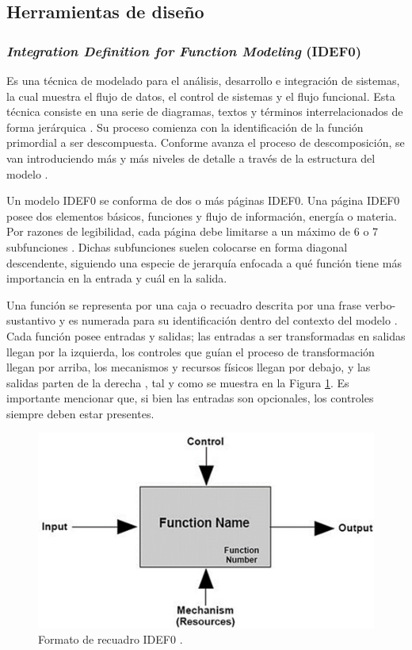 \subsection{Herramientas de diseño}
\subsubsection{\textit{Integration Definition for Function Modeling} (IDEF0)}
Es una técnica de modelado para el análisis, desarrollo e integración de sistemas, la cual muestra el flujo de datos, el control de sistemas y el flujo funcional. Esta técnica consiste en una serie de diagramas, textos y términos interrelacionados de forma jerárquica \cite{I5:2019:Online}. Su proceso comienza con la identificación de la función primordial a ser descompuesta. Conforme avanza el proceso de descomposición, se van introduciendo más y más niveles de detalle a través de la estructura del modelo \cite{I6:2019:Online}. 

Un modelo IDEF0 se conforma de dos o más páginas IDEF0. Una página IDEF0 posee dos elementos básicos, funciones y flujo de información, energía o materia. Por razones de legibilidad, cada página debe limitarse a un máximo de 6 o 7 subfunciones \cite{M14}. Dichas subfunciones suelen colocarse en forma diagonal descendente, siguiendo una especie de jerarquía enfocada a qué función tiene más importancia en la entrada y cuál en la salida.

Una función se representa por una caja o recuadro descrita por una frase verbo-sustantivo y es numerada para su identificación dentro del contexto del modelo \cite{M14}. Cada función posee entradas y salidas; las entradas a ser transformadas en salidas llegan por la izquierda, los controles que guían el proceso de transformación llegan por arriba, los mecanismos y recursos físicos llegan por debajo, y las salidas parten de la derecha \cite{I5:2019:Online}, tal y como se muestra en la Figura \ref{fig:idef0b}. Es importante mencionar que, si bien las entradas son opcionales, los controles siempre deben estar presentes.
\begin{figure}[H]
	\centering
	\includegraphics{imagenes/idef0b}
	\caption{Formato de recuadro IDEF0 \cite{I5:2019:Online}.}
	\label{fig:idef0b}
\end{figure}

